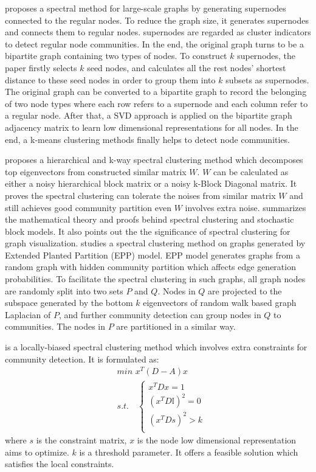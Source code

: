 \cite{liu2013large} proposes a spectral method for large-scale graphs by generating supernodes connected to the regular nodes. To reduce the graph size, it generates supernodes and connects them to regular nodes. supernodes are regarded as cluster indicators to detect regular node communities. In the end, the original graph turns to be a bipartite graph containing two types of nodes. To construct $k$ supernodes, the paper firstly selects $k$ seed nodes, and calculates all the rest nodes' shortest distance to these seed nodes in order to group them into $k$ subsets as supernodes. The original graph can be converted to a bipartite graph to record the belonging of two node types where each row refers to a supernode and each column refer to a regular node. After that, a SVD approach is applied on the bipartite graph adjacency matrix to learn low dimensional representations for all nodes. In the end, a k-means clustering methods finally helps to detect node communities. 

\cite{nadakuditi2012graph} proposes a hierarchical and k-way spectral clustering method which decomposes top eigenvectors from constructed similar matrix $W$.  $W$ can be calculated as either a noisy hierarchical block matrix or a noisy k-Block Diagonal matrix. It proves the spectral clustering can tolerate the noises from similar matrix $W$ and still achieves good community partition even $W$ involves extra noise.   \cite{rohe2011spectral} summarizes the mathematical theory and proofs behind spectral clustering and stochastic block models. It also points out the the significance of spectral clustering for graph visualization. \cite{chaudhuri2012spectral} studies a spectral clustering method on graphs generated by Extended Planted Partition (EPP) model. EPP model generates graphs from a random graph with hidden community partition which affects edge generation probabilities. To facilitate the spectral clustering in such graphs, all graph nodes are randomly split into two sets $P$ and $Q$. Nodes in $Q$ are projected to the subspace generated by the bottom $k$ eigenvectors of random walk based graph Laplacian of $P$, and further community detection can group nodes in $Q$ to communities. The nodes in $P$ are partitioned in a similar way.

\cite{mahoney2012local} is a locally-biased spectral clustering method which involves extra constraints for community detection. It is formulated as: 
\begin{equation}
\begin{split}
&min \,\, x^T(D-A)x\\
&s.t.\quad  \left\{\begin{array}{lc}
x^TDx = 1\\
(x^TD\mathbb{I})^2 = 0\\
(x^TDs)^2 > k\\ \end{array}\right.
\end{split}
\end{equation}
where $s$ is the constraint matrix, $x$ is the node low dimensional representation aims to optimize. $k$ is a threshold parameter. It offers a feasible solution which satisfies the local constraints. 

